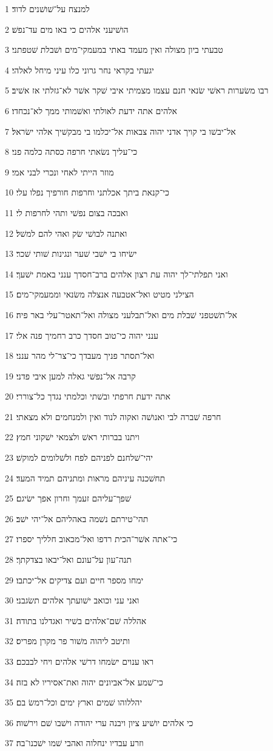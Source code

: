 \par 1 למנצח על־שׁושׁנים לדוד׃
\par 2 הושׁיעני אלהים כי באו מים עד־נפשׁ׃
\par 3 טבעתי ביון מצולה ואין מעמד באתי במעמקי־מים ושׁבלת שׁטפתני׃
\par 4 יגעתי בקראי נחר גרוני כלו עיני מיחל לאלהי׃
\par 5 רבו משׂערות ראשׁי שׂנאי חנם עצמו מצמיתי איבי שׁקר אשׁר לא־גזלתי אז אשׁיב׃
\par 6 אלהים אתה ידעת לאולתי ואשׁמותי ממך לא־נכחדו׃
\par 7 אל־יבשׁו בי קויך אדני יהוה צבאות אל־יכלמו בי מבקשׁיך אלהי ישׂראל׃
\par 8 כי־עליך נשׂאתי חרפה כסתה כלמה פני׃
\par 9 מוזר הייתי לאחי ונכרי לבני אמי׃
\par 10 כי־קנאת ביתך אכלתני וחרפות חורפיך נפלו עלי׃
\par 11 ואבכה בצום נפשׁי ותהי לחרפות לי׃
\par 12 ואתנה לבושׁי שׂק ואהי להם למשׁל׃
\par 13 ישׂיחו בי ישׁבי שׁער ונגינות שׁותי שׁכר׃
\par 14 ואני תפלתי־לך יהוה עת רצון אלהים ברב־חסדך ענני באמת ישׁעך׃
\par 15 הצילני מטיט ואל־אטבעה אנצלה משׂנאי וממעמקי־מים׃
\par 16 אל־תשׁטפני שׁבלת מים ואל־תבלעני מצולה ואל־תאטר־עלי באר פיה׃
\par 17 ענני יהוה כי־טוב חסדך כרב רחמיך פנה אלי׃
\par 18 ואל־תסתר פניך מעבדך כי־צר־לי מהר ענני׃
\par 19 קרבה אל־נפשׁי גאלה למען איבי פדני׃
\par 20 אתה ידעת חרפתי ובשׁתי וכלמתי נגדך כל־צוררי׃
\par 21 חרפה שׁברה לבי ואנושׁה ואקוה לנוד ואין ולמנחמים ולא מצאתי׃
\par 22 ויתנו בברותי ראשׁ ולצמאי ישׁקוני חמץ׃
\par 23 יהי־שׁלחנם לפניהם לפח ולשׁלומים למוקשׁ׃
\par 24 תחשׁכנה עיניהם מראות ומתניהם תמיד המעד׃
\par 25 שׁפך־עליהם זעמך וחרון אפך ישׂיגם׃
\par 26 תהי־טירתם נשׁמה באהליהם אל־יהי ישׁב׃
\par 27 כי־אתה אשׁר־הכית רדפו ואל־מכאוב חלליך יספרו׃
\par 28 תנה־עון על־עונם ואל־יבאו בצדקתך׃
\par 29 ימחו מספר חיים ועם צדיקים אל־יכתבו׃
\par 30 ואני עני וכואב ישׁועתך אלהים תשׂגבני׃
\par 31 אהללה שׁם־אלהים בשׁיר ואגדלנו בתודה׃
\par 32 ותיטב ליהוה משׁור פר מקרן מפריס׃
\par 33 ראו ענוים ישׂמחו דרשׁי אלהים ויחי לבבכם׃
\par 34 כי־שׁמע אל־אביונים יהוה ואת־אסיריו לא בזה׃
\par 35 יהללוהו שׁמים וארץ ימים וכל־רמשׂ בם׃
\par 36 כי אלהים יושׁיע ציון ויבנה ערי יהודה וישׁבו שׁם וירשׁוה׃
\par 37 וזרע עבדיו ינחלוה ואהבי שׁמו ישׁכנו־בה׃

